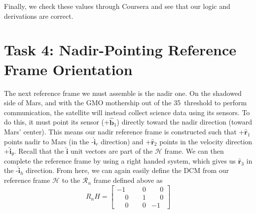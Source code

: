 \documentclass[conf]{new-aiaa}
\begin{document}
Finally, we check these values through Coursera and see that our logic and derivations are correct.















\section{Task 4: Nadir-Pointing Reference Frame Orientation}
The next reference frame we must assemble is the nadir one. On the shadowed side of Mars, and with the GMO mothership out of the 35\textdegree\  threshold to perform communication, the satellite will instead collect science data using its sensors. To do this, it must point its sensor (+$\hat{\bm{b}}_1$) directly toward the nadir direction (toward Mars' center). This means our nadir reference frame is constructed such that +$\hat{\bm{r}}_1$ points nadir to Mars (in the -$\hat{\bm{i}}_r$ direction) and +$\hat{\bm{r}}_2$ points in the velocity direction +$\hat{\bm{i}}_\theta$. Recall that the $\hat{\bm{i}}$ unit vectors are part of the $\mathcal{H}$ frame. We can then complete the reference frame by using a right handed system, which gives us $\hat{\bm{r}}_3$ in the -$\hat{\bm{i}}_h$ direction. From here, we can again easily define the DCM from our reference frame $\mathcal{H}$ to the $\mathcal{R}_n$ frame defined above as 
 \[R_nH = \begin{bmatrix}
-1 & \phantom{-}0 & \phantom{-}0 \\
\phantom{-}0 & \phantom{-}1 & \phantom{-}0 \\
\phantom{-}0 & \phantom{-}0 & -1
\end{bmatrix}\]
\end{document}
